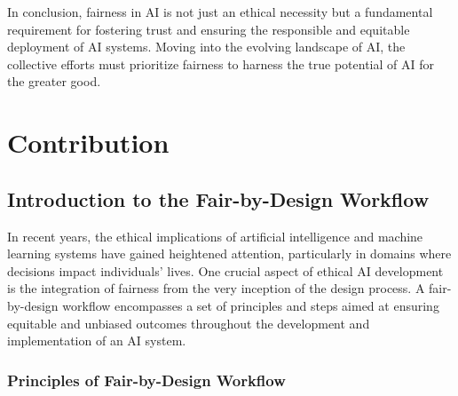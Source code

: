 \documentclass[12pt,a4paper,openright,twoside]{book}
\begin{document}
In conclusion, fairness in AI is not just an ethical necessity but a fundamental requirement for fostering trust and ensuring the responsible and equitable deployment of AI systems. Moving into the evolving landscape of AI, the collective efforts must prioritize fairness to harness the true potential of AI for the greater good.

%

\chapter{Contribution} %
\label{chap:contribution}

\section{Introduction to the Fair-by-Design Workflow}

In recent years, the ethical implications of artificial intelligence and machine learning systems have gained heightened attention, particularly in domains where decisions impact individuals' lives. One crucial aspect of ethical AI development is the integration of fairness from the very inception of the design process. A fair-by-design workflow encompasses a set of principles and steps aimed at ensuring equitable and unbiased outcomes throughout the development and implementation of an AI system.

\subsection{Principles of Fair-by-Design Workflow}
\end{document}
